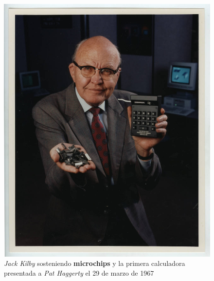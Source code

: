 \begin{figure}[htb]
	\centering
	\includegraphics[scale = 2]{Graphics/Jack_Kilby_microchips_first_calculator.jpg}
	\caption{\emph{Jack Kilby} sosteniendo \textbf{microchips} y la primera calculadora presentada a \emph{Pat Haggerty} el 29 de marzo de 1967}
	\label{fig:9}
\end{figure}

